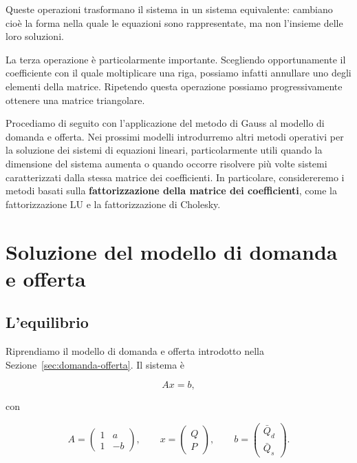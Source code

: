 Queste operazioni trasformano il sistema in un sistema equivalente:
cambiano cioè la forma nella quale le equazioni sono rappresentate,
ma non l'insieme delle loro soluzioni.

La terza operazione è particolarmente importante. Scegliendo
opportunamente il coefficiente con il quale moltiplicare una riga,
possiamo infatti annullare uno degli elementi della matrice.
Ripetendo questa operazione possiamo progressivamente ottenere una
matrice triangolare.

Procediamo di seguito con l'applicazione del metodo di Gauss al modello di domanda e offerta. Nei prossimi modelli introdurremo altri metodi operativi per la soluzione dei sistemi di equazioni lineari, particolarmente utili quando la dimensione del sistema aumenta o quando occorre risolvere più volte sistemi caratterizzati dalla stessa matrice dei coefficienti. In particolare, considereremo i metodi basati sulla \textbf{fattorizzazione della matrice dei coefficienti}, come la fattorizzazione LU e la fattorizzazione di Cholesky.

\section{Soluzione del modello di domanda e offerta}
\subsection{L'equilibrio}
Riprendiamo il modello di domanda e offerta introdotto nella
Sezione~\ref{sec:domanda-offerta}. Il sistema è

\begin{equation*}
    Ax=b,
\end{equation*}

con

\begin{equation*}
    A=
    \begin{pmatrix}
        1 & a\\
        1 & -b
    \end{pmatrix},
    \qquad
    x=
    \begin{pmatrix}
        Q\\
        P
    \end{pmatrix},
    \qquad
    b=
    \begin{pmatrix}
        \bar Q_d\\
        \bar Q_s
    \end{pmatrix}.
\end{equation*}


